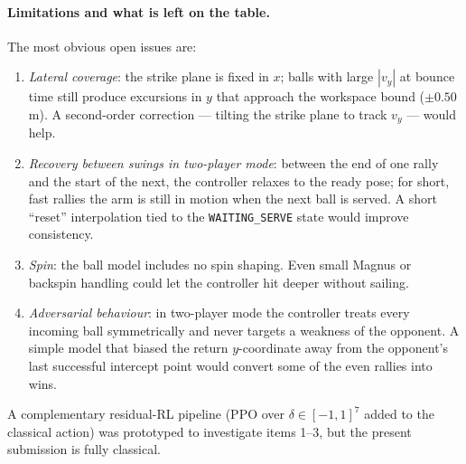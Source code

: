 \paragraph{Limitations and what is left on the table.}
The most obvious open issues are:
\begin{enumerate}
  \item \emph{Lateral coverage}: the strike plane is fixed in $x$;
        balls with large $|v_{y}|$ at bounce time still produce
        excursions in $y$ that approach the workspace bound
        ($\pm 0.50$\,m). A second-order correction --- tilting the
        strike plane to track $v_{y}$ --- would help.
  \item \emph{Recovery between swings in two-player mode}: between the
        end of one rally and the start of the next, the controller
        relaxes to the ready pose; for short, fast rallies the arm is
        still in motion when the next ball is served. A short
        ``reset'' interpolation tied to the
        \texttt{WAITING\_SERVE} state would improve consistency.
  \item \emph{Spin}: the ball model includes no spin shaping. Even
        small Magnus or backspin handling could let the controller hit
        deeper without sailing.
  \item \emph{Adversarial behaviour}: in two-player mode the controller
        treats every incoming ball symmetrically and never targets a
        weakness of the opponent. A simple model that biased the
        return $y$-coordinate away from the opponent's last
        successful intercept point would convert some of the
        even rallies into wins.
\end{enumerate}
A complementary residual-RL pipeline (PPO over $\delta\in[-1,1]^{7}$
added to the classical action) was prototyped to investigate
items 1--3, but the present submission is fully classical.
